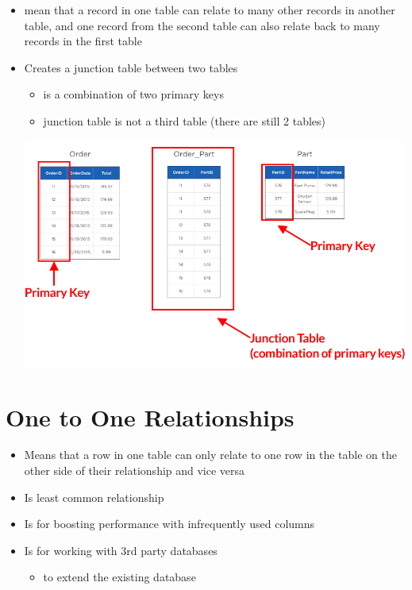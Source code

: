 \documentclass[12pt]{article}
\begin{document}
\begin{itemize}
    \item mean that a record in one table can relate to many other records in
    another table, and one record from the second table can also relate back
    to many records in the first table
    \item Creates a junction table between two tables
    \begin{itemize}
        \item is a combination of two primary keys
        \item junction table is not a third table (there are still 2 tables)
    \end{itemize}

    \begin{center}
    \includegraphics[width=0.8\linewidth]{images/part_3_notes_2.png}
    \end{center}
\end{itemize}

\bigskip

\section{One to One Relationships}

\bigskip

\begin{itemize}
    \item Means that a row in one table can only relate to one row in the table
    on the other side of their relationship and vice versa
    \item Is least common relationship
    \item Is for boosting performance with infrequently used columns
    \item Is for working with 3rd party databases
    \begin{itemize}
        \item to extend the existing database
    \end{itemize}
\end{itemize}
\end{document}
